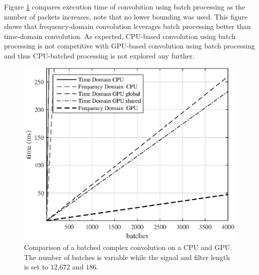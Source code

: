 Figure \ref{fig:CPUvsGPU_varyBatches_186taps_12672signal} compares execution time of convolution using batch processing as the number of packets increases, note that no lower bounding was used.
This figure shows that frequency-domain convolution leverages batch processing better than time-domain convolution.
As expected, CPU-based convolution using batch processing is not competitive with GPU-based convolution using batch processing and thus CPU-batched processing is not explored any further.
\begin{figure}
	\centering\includegraphics[width=5in]{figures/gpu_intro/CPUvsGPU_varyBatches_186taps_12672signal.eps}
	\caption{Comparison of a batched complex convolution on a CPU and GPU. The number of batches is variable while the signal and filter length is set to $12$,$672$ and $186$.}
	\label{fig:CPUvsGPU_varyBatches_186taps_12672signal}
\end{figure}


